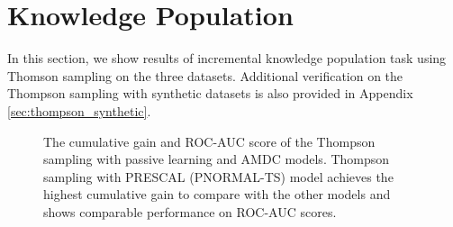 
\section{Knowledge Population}
\label{sec:exp2}

In this section, we show results of incremental knowledge population task using Thomson sampling on the three datasets.
Additional verification on the Thompson sampling with synthetic datasets is also provided in Appendix \ref{sec:thompson_synthetic}.

\begin{figure}[t]
	\centering

	\caption{\label{fig:vs_greedy} The cumulative gain and ROC-AUC score of the Thompson sampling with passive learning and  AMDC models. Thompson sampling with PRESCAL (\textsc{PNORMAL-TS}) model achieves the highest cumulative gain to compare with the other models and shows comparable performance on ROC-AUC scores.}
\end{figure}

